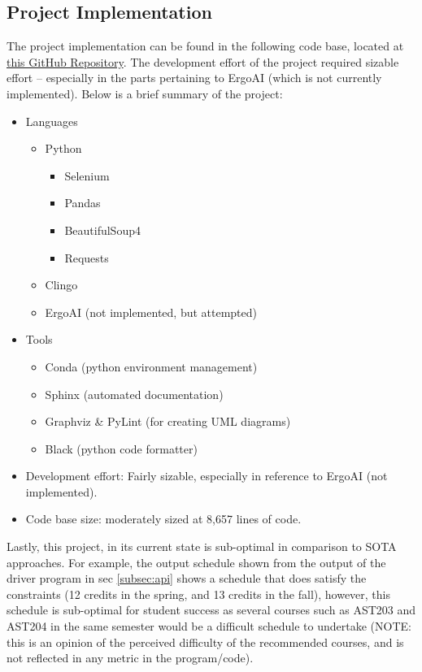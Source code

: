 \documentclass[12pt]{article}
\def \repoLink{https://github.com/AdebayoBraimah/CSE505}
\begin{document}
    \subsection{Project Implementation}
    \label{subsec:proj-imp}

    The project implementation can be found in the following code base, located at \href{\repoLink}{this GitHub Repository}. The development effort of the project required sizable effort -- especially in the parts pertaining to ErgoAI\cite{ergoai} (which is not currently implemented). Below is a brief summary of the project:

    \begin{itemize}
        \item Languages
        \begin{itemize}
            \item Python
            \begin{itemize}
                \item Selenium
                \item Pandas
                \item BeautifulSoup4
                \item Requests
            \end{itemize}
            \item Clingo
            \item ErgoAI (not implemented, but attempted)
        \end{itemize}
        \item Tools
            \begin{itemize}
                \item Conda (python environment management)
                \item Sphinx (automated documentation)
                \item Graphviz \& PyLint (for creating UML diagrams)
                \item Black (python code formatter)
            \end{itemize}
        \item Development effort: Fairly sizable, especially in reference to ErgoAI (not implemented).
        \item Code base size: moderately sized at 8,657 lines of code.
    \end{itemize}

    Lastly, this project, in its current state is sub-optimal in comparison to SOTA approaches.
    For example, the output schedule shown from the output of the driver program in sec \ref{subsec:api} shows a schedule that does satisfy the constraints (12 credits in the spring, and 13 credits in the fall), however, this schedule is sub-optimal for student success as several courses such as AST203 and AST204 in the same semester would be a difficult schedule to undertake (NOTE: this is an opinion of the perceived difficulty of the recommended courses, and is not reflected in any metric in the program/code).
    
\end{document}
